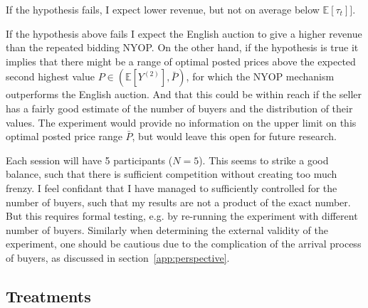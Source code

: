 \documentclass[a4paper,12pt]{article}
\begin{document}
	\noindent{}

	If the hypothesis fails, I expect lower revenue, but not on average below $\mathbb{E}[\tau_t]]$.

	\noindent{}
	
	If the hypothesis above fails I expect the English auction to give a higher revenue than the repeated bidding NYOP. On the other hand, if the hypothesis is true it implies that there might be a range of optimal posted prices above the expected second highest value $P \in (\mathbb{E}[Y^{(2)}], \bar{P})$, for which the NYOP mechanism outperforms the English auction. And that this could be within reach if the seller has a fairly good estimate of the number of buyers and the distribution of their values. The experiment would provide no information on the upper limit on this optimal posted price range $\bar{P}$, but would leave this open for future research.
	
	Each session will have 5 participants ($N=5$). This seems to strike a good balance, such that there is sufficient competition without creating too much frenzy. I feel confidant that I have managed to sufficiently controlled for the number of buyers, such that my results are not a product of the exact number. But this requires formal testing, e.g. by re-running the experiment with different number of buyers. Similarly when determining the external validity of the experiment, one should be cautious due to the complication of the arrival process of buyers, as discussed in section~\ref{app:perspective}.

	\subsection{Treatments}
	\label{sec:treatments}
\end{document}
